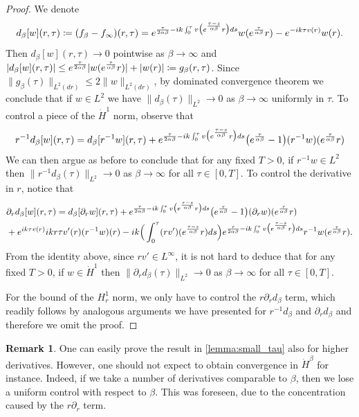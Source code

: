 \documentclass[11pt,reqno]{amsproc}
\def\dd{{\rm d}}
\def\e{{\rm e}}
\def\de{{\partial}}
\theoremstyle{definition}
\newtheorem{remark}[proposition]{Remark}
\theoremstyle{definition}
\numberwithin{equation}{section}
\begin{document}
\begin{proof}
 We denote 
 \[
 d_\beta[w](r,\tau) \coloneqq (f_\beta-f_\infty)(r,\tau)=\e^{\frac{\tau}{2\alpha\beta}-ik\int_0^\tau v\big(\e^{\frac{\tau-s}{\alpha\beta}}r\big)\dd s}w(\e^{\frac{\tau}{\alpha\beta}}r) 
-\e^{-ik\tau v(r)}w(r).
 \]
    Then $d_\beta[w](r,\tau)\to 0$ pointwise as $\beta\to \infty$ and $|d_\beta[w](r,\tau)|\leq \e^{\frac{\tau}{2\alpha\beta}}|w(\e^{\frac{\tau}{\alpha\beta}}r)|+|w(r)|\coloneqq g_\beta(r,\tau)$. Since $\|g_\beta(\tau)\|_{L^2(dr)}\leq 2\|w\|_{L^2(dr)}$,  by dominated convergence theorem we conclude that if $w\in L^2$ we have $\|d_\beta(\tau)\|_{L^2} \to 0$ as $\beta \to \infty$ uniformly in $\tau$. To control a piece of the $\dot{H}^1$ norm, observe that 
    \begin{equation}
        r^{-1}d_\beta[w](r,\tau)=d_\beta[r^{-1}w](r,\tau)+\e^{\frac{\tau}{2\alpha\beta}-ik\int_0^\tau v\big(\e^{\frac{\tau-s}{\alpha\beta}}r\big)\dd s}\big(\e^{\frac{\tau}{\alpha \beta}}-1\big)(r^{-1}w)(\e^{\frac{\tau}{\alpha\beta}}r) 
    \end{equation}
    We can then argue as before to conclude that for any fixed $T>0$, if $r^{-1}w\in L^2$ then $\|r^{-1}d_\beta(\tau)\|_{L^2}\to 0$ as $\beta \to \infty$ for all $\tau\in [0,T]$. To control the derivative in $r$, notice that
    \begin{align}
        &\de_r d_\beta[w](r,\tau)=d_\beta[\de_rw](r,\tau)+\e^{\frac{\tau}{2\alpha\beta}-ik\int_0^\tau v\big(\e^{\frac{\tau-s}{\alpha\beta}}r\big)\dd s}\big(\e^{\frac{\tau}{\alpha \beta}}-1\big)(\de_rw)(\e^{\frac{\tau}{\alpha\beta}}r) \\
        &+\e^{ik\tau v(r)} ikr\tau v'(r) (r^{-1}w)(r)-ik\Big(\int_0^\tau (rv')(\e^{\frac{\tau-s}{\alpha \beta}}r)\dd s\Big)\e^{\frac{\tau}{2\alpha\beta}-ik\int_0^\tau v\big(\e^{\frac{\tau-s}{\alpha\beta}}r\big)\dd s}r^{-1}w(\e^{\frac{\tau}{\alpha\beta}}r).
    \end{align}
    From the identity above, since $rv'\in L^\infty$, it is not hard to deduce that for any fixed $T>0$,  if $w\in \dot{H}^1$ then $\|\de_rd_\beta(\tau)\|_{L^2}\to0$ as $\beta\to \infty$ for all $\tau\in [0,T]$.

    For the bound of the $H^1_r$ norm, we only have to control the $r\de_rd_\beta$ term, which readily follows by analogous arguments we have presented for $r^{-1}d_\beta$ and $\de_rd_\beta$ and therefore we omit the proof.
\end{proof}
\begin{remark}
    One can easily prove the result in \cref{lemma:small_tau} also for higher derivatives. However, one should not expect to obtain convergence in $\dot{H}^\beta$ for instance. Indeed, if we take a number of derivatives comparable to $\beta$, then we lose a uniform control with respect to $\beta$. This was foreseen, due to the concentration caused by  the $r\de_r$ term.
\end{remark}
\end{document}

